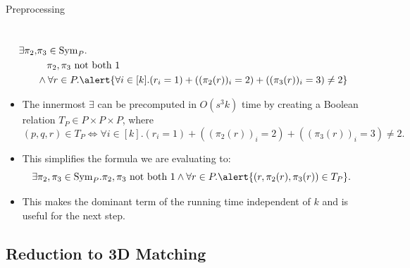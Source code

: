 \documentclass[t,10pt,
mathserif,xcolor=dvipsnames]{beamer}
\begin{document}
\begin{myframe}{Preprocessing}
  
  ~\\[-5ex]
  \begin{equation*}
    \begin{aligned}
      \exists \pi_2,&\pi_3 \in \Sym{P}.\\
      &~~~\pi_2, \pi_3 \text{ not both } 1\\
      &\wedge \forall r \in P. \alert{\forall i \in [k]. (r_i = 1) + ((\pi_2(r))_i = 2) + ((\pi_3(r))_i = 3) \neq 2}
    \end{aligned}
  \end{equation*}


  \begin{itemize}
  \item The innermost $\exists$ can be precomputed in $O(s^3k)$ time
    by creating a Boolean relation $T_P \in P \times P \times P$, where
    $$(p,q,r) \in T_P \Leftrightarrow \forall i \in [k]. (r_i = 1) + ((\pi_2(r))_i = 2) + ((\pi_3(r))_i = 3) \neq 2.$$

  \item This simplifies the formula we are evaluating to:
    $$\exists \pi_2,\pi_3 \in \Sym{P}. \pi_2, \pi_3 \text{ not both } 1 \wedge
    \forall r \in P. \alert{(r,\pi_2(r),\pi_3(r)) \in T_P}.$$
  \item This makes the dominant term of the running time independent
    of $k$ and is useful for the next step.
  \end{itemize}
  
\end{myframe}

\subsection{Reduction to 3D Matching}
\end{document}
